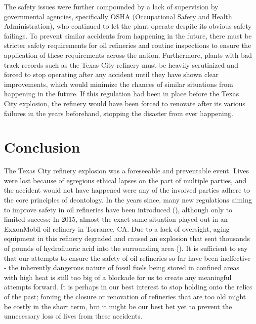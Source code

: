 \documentclass[12pt]{article}
\begin{document}
	The safety issues were further compounded by a lack of supervision by governmental agencies, specifically OSHA (Occupational Safety and Health Administration), who continued to let the plant operate despite its obvious safety failings. To prevent similar accidents from happening in the future, there must be stricter safety requirements for oil refineries and routine inspections to ensure the application of these requirements across the nation. Furthermore, plants with bad track records such as the Texas City refinery must be heavily scrutinized and forced to stop operating after any accident until they have shown clear improvements, which would minimize the chances of similar situations from happening in the future. If this regulation had been in place before the Texas City explosion, the refinery would have been forced to renovate after its various failures in the years beforehand, stopping the disaster from ever happening.
	\section*{Conclusion}
	The Texas City refinery explosion was a foreseeable and preventable event. Lives were lost because of egregious ethical lapses on the part of multiple parties, and the accident would not have happened were any of the involved parties adhere to the core principles of deontology. In the years since, many new regulations aiming to improve safety in oil refineries have been introduced (\cite{calaw}), although only to limited success: In 2015, almost the exact same situation played out in an ExxonMobil oil refinery in Torrance, CA. Due to a lack of oversight, aging equipment in this refinery degraded and caused an explosion that sent thousands of pounds of hydrofluoric acid into the surrounding area (\cite{exxonmobilreport}). It is sufficient to say that our attempts to ensure the safety of oil refineries so far have been ineffective - the inherently dangerous nature of fossil fuels being stored in confined areas with high heat is still too big of a blockade for us to create any meaningful attempts forward. It is perhaps in our best interest to stop holding onto the relics of the past; forcing the closure or renovation of refineries that are too old might be costly in the short term, but it might be our best bet yet to prevent the unnecessary loss of lives from these accidents.
	
\end{document}
